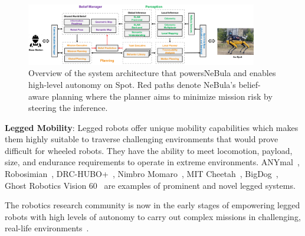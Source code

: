 \documentclass[letterpaper, 10pt, conference]{ieeeconf}      %
\newcommand{\ph}[1]{{\textbf{#1}:}} %
\newcommand{\rev}[1]{{\color{blue}#1}} %
\begin{document}
\begin{figure}[h!]
  \centering
  \includegraphics[width=0.9\textwidth]{graphics/spot_sa_v5.pdf}
  \caption{Overview of the system architecture \rev{that powers}NeBula and enables high-level autonomy on Spot. \rev{Red paths denote NeBula's belief-aware planning where the planner aims to minimize mission risk by steering the inference.} 
}
  \label{fig:spot_sysarch}
\end{figure}

\ph{Legged Mobility}
Legged robots offer unique mobility capabilities which makes them highly suitable to traverse challenging environments \rev{that} would prove difficult for wheeled robots.
They have the ability to meet locomotion, payload, size, and endurance requirements to operate in extreme environments. %
ANYmal~\cite{whyrobotdeepmines,Bellicoso2018}, Robosimian~\cite{Karumanchi2017}, DRC-HUBO+~\cite{jung2018development}, Nimbro Momaro~\cite{schwarz2017nimbro}, MIT Cheetah~\cite{mit_cheetah}, BigDog~\cite{bigdog}, Ghost Robotics \rev{Vision 60}~\cite{miller2019tunnel} are examples of %
\rev{prominent and novel legged} %
systems. 

The robotics research community is now in the early stages of empowering legged robots with high levels of autonomy to carry out complex missions in challenging, real-life environments~\cite{Delmerico2019}.
\end{document}
